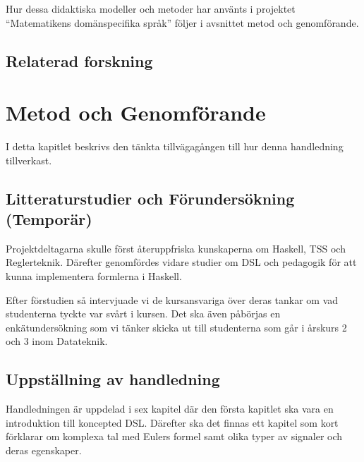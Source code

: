 \documentclass[]{article}
\begin{document}
Hur dessa didaktiska modeller och metoder har använts i projektet “Matematikens domänspecifika språk” 
följer i avsnittet metod och genomförande.


\subsection{Relaterad forskning}


\section{Metod och Genomförande}



I detta kapitlet beskrivs den tänkta tillvägagången till hur denna
handledning tillverkast.

\subsection{Litteraturstudier och Förundersökning (Temporär)}


Projektdeltagarna skulle först återuppfriska kunskaperna om Haskell, TSS
och Reglerteknik. Därefter genomfördes vidare studier om DSL och pedagogik för
att kunna implementera formlerna i Haskell.

Efter förstudien så intervjuade vi de kursansvariga över deras tankar om vad
studenterna tyckte var svårt i kursen. Det ska även påbörjas en enkätundersökning
som vi tänker skicka ut till studenterna som går i årskurs 2 och 3 inom Datateknik.


\subsection{Uppställning av handledning}


Handledningen är uppdelad i sex kapitel %
där den första kapitlet ska vara en introduktion till koncepted DSL. Därefter ska det finnas
ett kapitel som kort förklarar om komplexa tal med Eulers formel samt olika typer av
signaler och deras egenskaper.
\end{document}
